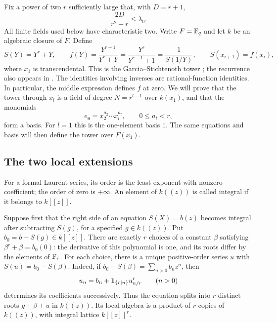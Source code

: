 Fix a power of two $r$ sufficiently large that, with $D=r+1$,
\begin{equation}\label{eq:pencil-parameters}
 \frac{2D}{r^2-r}\leq\lambda_0.
\end{equation}
All finite fields used below have characteristic two.  Write $F=\mathbb F_q$ and
let $k$ be an algebraic closure of $F$.  Define
\begin{equation}\label{eq:pencil-tower}
 S(Y)=Y^r+Y,\qquad
 f(Y)=\frac{Y^{r+1}}{Y^r+Y}
     =\frac{Y^r}{Y^{r-1}+1}
     =\frac{1}{S(1/Y)},\qquad
 S(x_{i+1})=f(x_i),
\end{equation}
where $x_1$ is transcendental. This is the Garcia--Stichtenoth tower
\cite{GS1996}; the recurrence also appears in
\cite[Example~3.3]{Stichtenoth2001}.  The identities involving inverses are
rational-function identities.  In particular, the middle expression defines
$f$ at zero.  We will prove that the tower through $x_l$ is a field of degree
$N=r^{l-1}$ over $k(x_1)$, and that the monomials
\begin{equation}\label{eq:pencil-power-basis}
 e_{\boldsymbol a}=x_2^{a_2}\cdots x_l^{a_l},
 \qquad 0\leq a_i<r,
\end{equation}
form a basis.  For $l=1$ this is the one-element basis $1$.
The same equations and basis will then define the tower over $F(x_1)$.

\subsection{The two local extensions}

For a formal Laurent series, its order is the least exponent with nonzero
coefficient; the order of zero is $+\infty$.  An element of $k((z))$ is
called integral if it belongs to $k[[z]]$.

Suppose first that the right side of an equation $S(X)=b(z)$ becomes
integral after subtracting $S(g)$, for a specified $g\in k((z))$.  Put
$b_0=b-S(g)\in k[[z]]$.  There are exactly $r$ choices of a constant
$\beta$ satisfying $\beta^r+\beta=b_0(0)$: the derivative of this polynomial
is one, and its roots differ by the elements of $\mathbb F_r$.  For each choice,
there is a unique positive-order series $u$ with
$S(u)=b_0-S(\beta)$.  Indeed, if $b_0-S(\beta)=\sum_{n>0}b_nz^n$, then
\begin{equation}\label{eq:pencil-additive-recursion}
 u_n=b_n+\mathbf 1_{\{r\mid n\}}u_{n/r}^{r}\qquad(n>0)
\end{equation}
determines its coefficients successively.  Thus the equation splits into
$r$ distinct roots $g+\beta+u$ in $k((z))$.  Its local algebra is a product
of $r$ copies of $k((z))$, with integral lattice $k[[z]]^r$.

